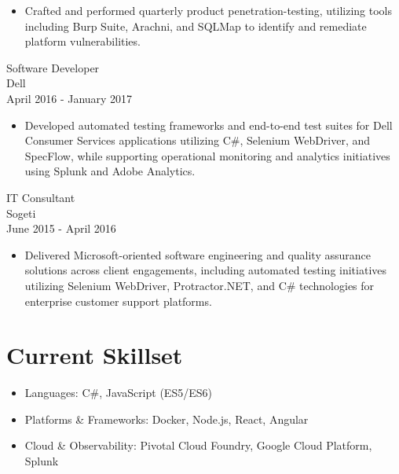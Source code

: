 \documentclass[11pt]{res}
\begin{document}
\begin{resume}
\begin{itemize}
\item Crafted and performed quarterly product penetration-testing, utilizing tools including Burp Suite, Arachni, and SQLMap to identify and remediate platform vulnerabilities.

\end{itemize}

Software Developer \\
Dell \\
April 2016 - January 2017
\vspace{0.08in}

\begin{itemize} \itemsep -2pt

\item Developed automated testing frameworks and end-to-end test suites for Dell Consumer Services applications utilizing C\#, Selenium WebDriver, and SpecFlow, while supporting operational monitoring and analytics initiatives using Splunk and Adobe Analytics.

\end{itemize}

IT Consultant \\
Sogeti \\
June 2015 - April 2016
\vspace{0.08in}

\begin{itemize} \itemsep -2pt

\item Delivered Microsoft-oriented software engineering and quality assurance solutions across client engagements, including automated testing initiatives utilizing Selenium WebDriver, Protractor.NET, and C\# technologies for enterprise customer support platforms.

\end{itemize}

\section{Current Skillset}

\begin{itemize} \itemsep -2pt

\item Languages: C\#, JavaScript (ES5/ES6)

\item Platforms \& Frameworks: Docker, Node.js, React, Angular

\item Cloud \& Observability: Pivotal Cloud Foundry, Google Cloud Platform, Splunk


\end{itemize}
\end{resume}
\end{document}

